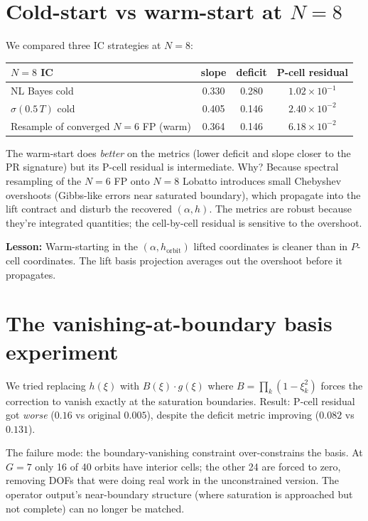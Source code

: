 \documentclass[11pt]{article}
\begin{document}
\section{Cold-start vs warm-start at $N=8$}

We compared three IC strategies at $N=8$:

\begin{center}\begin{tabular}{lccc}\toprule
$N=8$ IC & slope & deficit & P-cell residual \\\midrule
NL Bayes cold & 0.330 & 0.280 & $1.02\times 10^{-1}$ \\
$\sigma(0.5\,T)$ cold & 0.405 & 0.146 & $2.40\times 10^{-2}$ \\
Resample of converged $N=6$ FP (warm) & 0.364 & 0.146 & $6.18\times 10^{-2}$ \\\bottomrule\end{tabular}\end{center}

The warm-start does \emph{better} on the metrics (lower deficit and slope closer to the
PR signature) but its P-cell residual is intermediate. Why? Because spectral resampling
of the $N=6$ FP onto $N=8$ Lobatto introduces small Chebyshev overshoots (Gibbs-like
errors near saturated boundary), which propagate into the lift contract and disturb
the recovered $(\alpha, h)$. The metrics are robust because they're integrated quantities;
the cell-by-cell residual is sensitive to the overshoot.

\textbf{Lesson:} Warm-starting in the $(\alpha, h_{\mathrm{orbit}})$ lifted coordinates is
cleaner than in $P$-cell coordinates. The lift basis projection averages out the
overshoot before it propagates.

\section{The vanishing-at-boundary basis experiment}

We tried replacing $h(\xi)$ with $B(\xi)\cdot g(\xi)$ where $B = \prod_k(1-\xi_k^2)$
forces the correction to vanish exactly at the saturation boundaries. Result: P-cell
residual got \emph{worse} ($0.16$ vs original $0.005$), despite the deficit metric
improving ($0.082$ vs $0.131$).

The failure mode: the boundary-vanishing constraint over-constrains the basis. At $G=7$
only 16 of 40 orbits have interior cells; the other 24 are forced to zero, removing
DOFs that were doing real work in the unconstrained version. The operator output's
near-boundary structure (where saturation is approached but not complete) can no longer
be matched.
\end{document}
